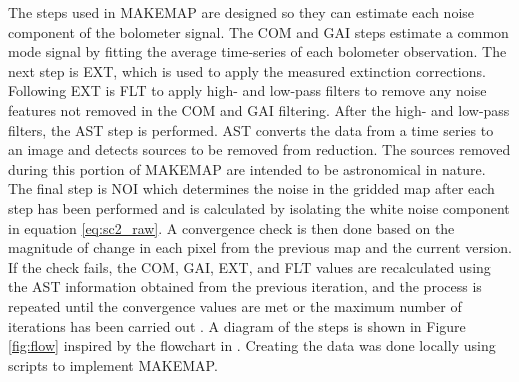 The steps used in MAKEMAP are designed so they can estimate each noise component of the bolometer signal.  The COM and GAI steps estimate a common mode signal by fitting the average time-series of each bolometer observation.  The next step is EXT, which is used to apply the measured extinction corrections.  Following EXT is FLT to apply high- and low-pass filters to remove any noise features not removed in the COM and GAI filtering.  After the high- and low-pass filters, the AST step is performed.  AST converts the data from a time series to an image and detects sources to be removed from reduction.  The sources removed during this portion of MAKEMAP are intended to be astronomical in nature.  The final step is NOI which determines the noise in the gridded map after each step has been performed and is calculated by isolating the white noise component in equation \ref{eq:sc2_raw}.  A convergence check is then done based on the magnitude of change in each pixel from the previous map and the current version.  If the check fails, the COM, GAI, EXT, and FLT values are recalculated using the AST information obtained from the previous iteration, and the process is repeated until the convergence values are met or the maximum number of iterations has been carried out \citep{chapin2013}.  A diagram of the steps is shown in Figure \ref{fig:flow} inspired by the flowchart in \cite{chapin2013}.  Creating the data was done locally using scripts to implement MAKEMAP.

